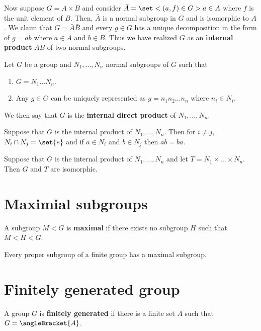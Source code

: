 Now suppose \(G = A \times B\) and consider \(\bar{A} = \set<(a,f) \in G>{a \in A}\) where \(f\) is the unit element of \(B\). Then, \(\bar{A}\) is a normal subgroup in \(G\) and is isomorphic to \(A\). We claim that \(G = \bar{A}\bar{B}\) and every \(g \in G\) has a unique decomposition in the form of \(g = \bar{a}\bar{b}\) where \(\bar{a} \in \bar{A}\) and \(\bar{b} \in \bar{B}\). Thus we have realized \(G\) as an \textbf{internal product} \(\bar{A}\bar{B}\) of two normal subgroups.

\begin{definition}
    Let \(G\) be a group and \(N_1, \dots , N_n\) normal subgroups of \(G\) such that 
    \begin{enumerate}
        \item \(G = N_1 \dots N_n\).
        \item Any \(g \in G\) can be uniquely represented as \(g = n_1n_2 \dots n_n\) where \(n_i \in N_i\).
    \end{enumerate}
    We then say that \(G\) is the \textbf{internal direct product} of \(N_1, \dots, N_n\).
\end{definition}

\begin{lemma}
    Suppose that \(G\) is the internal product of \(N_1, \dots , N_n\). Then for \(i \neq j\), \(N_i \cap N_j = \set{e}\) and if \(a \in N_i\) and \(b \in N_j\) then \(ab = ba\).
\end{lemma}

\begin{theorem}
    Suppose that \(G\) is the internal product of \(N_1, \dots , N_n\) and let \(T = N_1 \times \dots \times N_n\). Then \(G\) and \(T\) are isomorphic.
\end{theorem}

\section{Maximial subgroups}
\begin{definition}
    A subgroup \(M < G\) is \textbf{maximal} if there exists no subgroup \(H\) such that \(M < H < G\).
\end{definition}

\begin{theorem}
    Every proper subgroup of a finite group has a maximal subgroup.
\end{theorem}


\section{Finitely generated group}
\begin{definition}
    A group \(G\) is \textbf{finitely generated} if there is a finite set \(A\) such that \(G = \angleBracket{A}\).
\end{definition}

